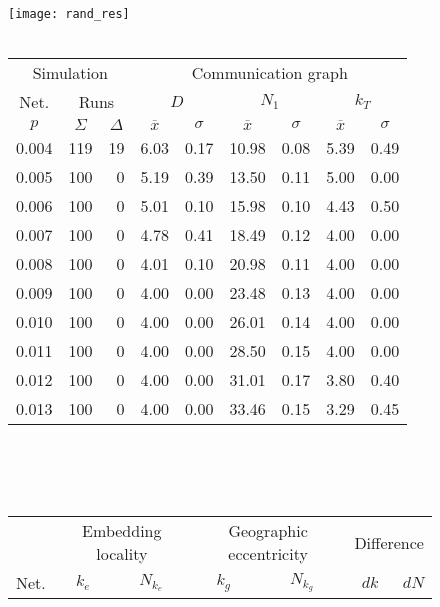 \documentclass{article}
\begin{document}
\begin{figure}[h]
\begin{center}
\texttt{[image: rand\_res]}
~\\~\\
\begin{tabular}{|r|rr|rr|rr|rr|}
\hline
\multicolumn{3}{|c|}{Simulation} & \multicolumn{6}{|c|}{Communication graph}\\
\multicolumn{1}{|c}{Net.} & \multicolumn{2}{c|}{Runs} & \multicolumn{2}{|c}{$D$} & \multicolumn{2}{c}{$N_1$} & \multicolumn{2}{c|}{$k_T$}\\
\hline
\multicolumn{1}{|c|}{$p$} & \multicolumn{1}{|c}{$\Sigma$} & \multicolumn{1}{c|}{$\Delta$} & \multicolumn{1}{|c}{$\overline{x}$} & \multicolumn{1}{c|}{$\sigma$} & \multicolumn{1}{|c}{$\overline{x}$} & \multicolumn{1}{c|}{$\sigma$} & \multicolumn{1}{|c}{$\overline{x}$} & \multicolumn{1}{c|}{$\sigma$}\\
0.004 & 119 & 19 & 6.03 & 0.17 & 10.98 & 0.08 & 5.39 & 0.49\\
0.005 & 100 &  0 & 5.19 & 0.39 & 13.50 & 0.11 & 5.00 & 0.00\\
0.006 & 100 &  0 & 5.01 & 0.10 & 15.98 & 0.10 & 4.43 & 0.50\\
0.007 & 100 &  0 & 4.78 & 0.41 & 18.49 & 0.12 & 4.00 & 0.00\\
0.008 & 100 &  0 & 4.01 & 0.10 & 20.98 & 0.11 & 4.00 & 0.00\\
0.009 & 100 &  0 & 4.00 & 0.00 & 23.48 & 0.13 & 4.00 & 0.00\\
0.010 & 100 &  0 & 4.00 & 0.00 & 26.01 & 0.14 & 4.00 & 0.00\\
0.011 & 100 &  0 & 4.00 & 0.00 & 28.50 & 0.15 & 4.00 & 0.00\\
0.012 & 100 &  0 & 4.00 & 0.00 & 31.01 & 0.17 & 3.80 & 0.40\\
0.013 & 100 &  0 & 4.00 & 0.00 & 33.46 & 0.15 & 3.29 & 0.45\\
\hline
\end{tabular}\\
~\\~\\
\begin{tabular}{|r|rr|rr|rr|rr|rr|}
\hline
& \multicolumn{4}{|c|}{Embedding locality} & \multicolumn{4}{|c|}{Geographic eccentricity} & \multicolumn{2}{|c|}{Difference}\\
Net. & \multicolumn{2}{c}{$k_e$} & \multicolumn{2}{c|}{$N_{k_e}$} & \multicolumn{2}{c}{$k_g$} & \multicolumn{2}{c|}{$N_{k_g}$}& $dk$ & $dN$\\

\end{tabular}
\end{center}
\end{figure}
\end{document}
